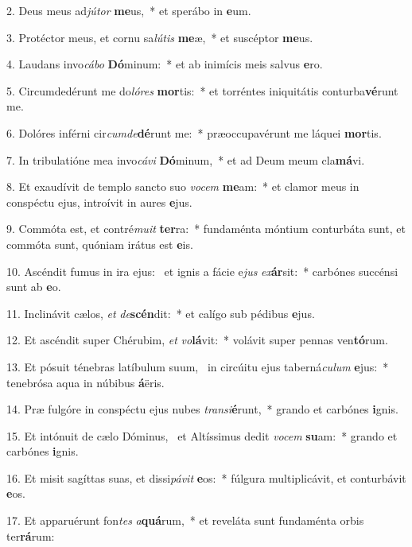 2. Deus meus ad\textit{jú}\textit{tor} \textbf{me}us,~*  et sperábo in \textbf{e}um.\

3. Protéctor meus, et cornu sa\textit{lú}\textit{tis} \textbf{me}æ,~*  et suscéptor \textbf{me}us.\

4. Laudans invo\textit{cá}\textit{bo} \textbf{Dó}minum:~*  et ab inimícis meis salvus \textbf{e}ro.\

5. Circumdedérunt me do\textit{ló}\textit{res} \textbf{mor}tis:~*  et torréntes iniquitátis conturba\textbf{vé}runt me.\

6. Dolóres inférni cir\textit{cum}\textit{de}\textbf{dé}runt me:~*  præoccupavérunt me láquei \textbf{mor}tis.\

7. In tribulatióne mea invo\textit{cá}\textit{vi} \textbf{Dó}minum,~*  et ad Deum meum cla\textbf{má}vi.\

8. Et exaudívit de templo sancto suo \textit{vo}\textit{cem} \textbf{me}am:~*  et clamor meus in conspéctu ejus, introívit in aures \textbf{e}jus.\

9. Commóta est, et contré\textit{mu}\textit{it} \textbf{ter}ra:~*  fundaménta móntium conturbáta sunt, et commóta sunt, quóniam irátus est \textbf{e}is.\

10. Ascéndit fumus in ira ejus: \dag\  et ignis a fácie e\textit{jus} \textit{ex}\textbf{ár}sit:~*  carbónes succénsi sunt ab \textbf{e}o.\

11. Inclinávit cælos, \textit{et} \textit{de}\textbf{scén}dit:~*  et calígo sub pédibus \textbf{e}jus.\

12. Et ascéndit super Chérubim, \textit{et} \textit{vo}\textbf{lá}vit:~*  volávit super pennas ven\textbf{tó}rum.\

13. Et pósuit ténebras latíbulum suum, \dag\  in circúitu ejus taberná\textit{cu}\textit{lum} \textbf{e}jus:~*  tenebrósa aqua in núbibus \textbf{á}ëris.\

14. Præ fulgóre in conspéctu ejus nubes \textit{trans}\textit{i}\textbf{é}runt,~*  grando et carbónes \textbf{i}gnis.\

15. Et intónuit de cælo Dóminus, \dag\  et Altíssimus dedit \textit{vo}\textit{cem} \textbf{su}am:~*  grando et carbónes \textbf{i}gnis.\

16. Et misit sagíttas suas, et dissi\textit{pá}\textit{vit} \textbf{e}os:~*  fúlgura multiplicávit, et conturbávit \textbf{e}os.\

17. Et apparuérunt fon\textit{tes} \textit{a}\textbf{quá}rum,~*  et reveláta sunt fundaménta orbis ter\textbf{rá}rum:\


